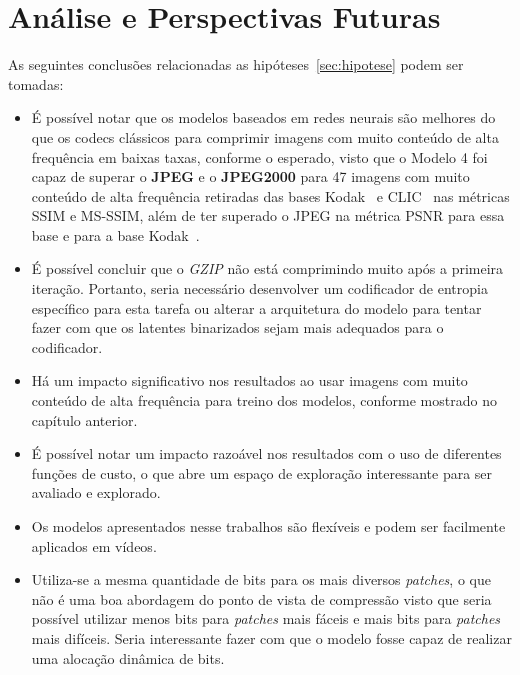 \section{Análise e Perspectivas Futuras}
\label{sec:analise}
As seguintes conclusões relacionadas as hipóteses~\ref{sec:hipotese} podem ser tomadas:
\begin{itemize}
    \item É possível notar que os modelos baseados em redes neurais são melhores do que os codecs clássicos para comprimir imagens com muito conteúdo de alta frequência em baixas taxas, conforme o esperado, visto que o Modelo 4 foi capaz de superar o \textbf{JPEG} e o \textbf{JPEG2000} para 47 imagens com muito conteúdo de alta frequência retiradas das bases Kodak~\cite{kodak} e CLIC~\cite{clic} nas métricas \acrshort{SSIM} e \acrshort{MS-SSIM}, além de ter superado o \acrshort{JPEG} na métrica \acrshort{PSNR} para essa base e para a base Kodak~\cite{kodak}.
    \item É possível concluir que o \textit{GZIP} não está comprimindo muito após a primeira iteração. Portanto, seria necessário desenvolver um codificador de entropia específico para esta tarefa ou alterar a arquitetura do modelo para tentar fazer com que os latentes binarizados sejam mais adequados para o codificador.
    \item Há um impacto significativo nos resultados ao usar imagens com muito conteúdo de alta frequência para treino dos modelos, conforme mostrado no capítulo anterior. 
    \item É possível notar um impacto razoável nos resultados com o uso de diferentes funções de custo, o que abre um espaço de exploração interessante para ser avaliado e explorado.
    \item Os modelos apresentados nesse trabalhos são flexíveis e podem ser facilmente aplicados em vídeos.
    \item Utiliza-se a mesma quantidade de bits para os mais diversos \textit{patches}, o que não é uma boa abordagem do ponto de vista de compressão visto que seria possível utilizar menos bits para \textit{patches} mais fáceis e mais bits para \textit{patches} mais difíceis. Seria interessante fazer com que o modelo fosse capaz de realizar uma alocação dinâmica de bits.
\end{itemize}

